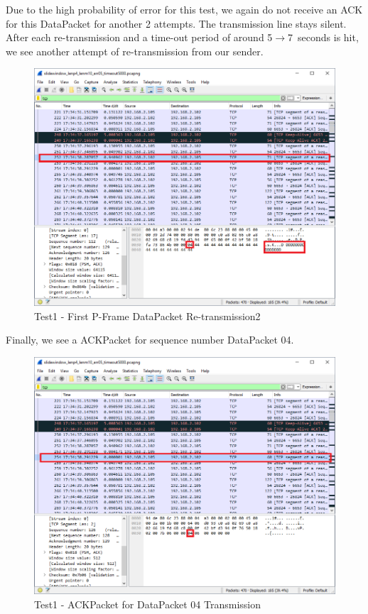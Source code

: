 \documentclass[12pt]{article}
\begin{document}
Due to the high probability of error for this test, we again do not receive 
an ACK for this DataPacket for another 2 attempts. The transmission line 
stays silent. After each re-transmission and a time-out period of around 
5$\rightarrow$7~seconds is hit, we see another attempt of re-transmission
from our sender.

\begin{figure}[H]
    \centering
    \includegraphics[width=5.5in]{slide_test1_03.png}
    \caption{Test1 - First P-Frame DataPacket Re-transmission2}
    \label{fig:slidetest03}
\end{figure}

Finally, we see a ACKPacket for sequence number DataPacket 04. 

\begin{figure}[H]
    \centering
    \includegraphics[width=5.5in]{slide_test1_04.png}
    \caption{Test1 - ACKPacket for DataPacket 04 Transmission}
    \label{fig:slidetest04}
\end{figure}
\end{document}
